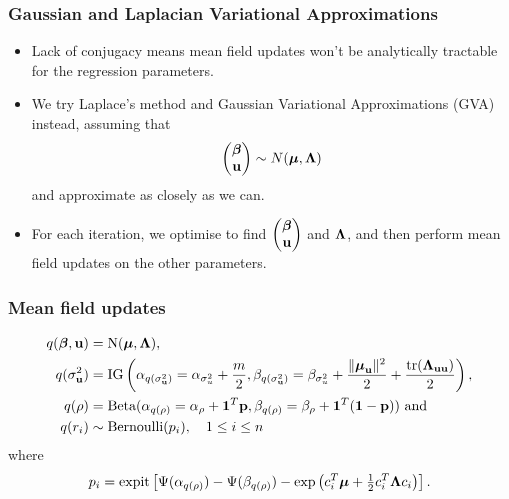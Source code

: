 \documentclass{beamer}
\begin{document}
\begin{frame}
	\frametitle{Gaussian and Laplacian Variational Approximations}
	\begin{itemize}
		\item Lack of conjugacy means mean field updates won't be analytically tractable for the regression parameters.
		\item We try Laplace's method and Gaussian Variational Approximations (GVA) instead, assuming that
		      $$
		      \begin{pmatrix}
		      	{\boldsymbol\beta} \\
		      	{\bf u}    
		      \end{pmatrix}
		      \sim N({\boldsymbol \mu}, {\boldsymbol \Lambda})
		      $$
		      and approximate as closely as we can.
		\item For each iteration, we optimise to find
		      $\begin{pmatrix}
		      	{\boldsymbol\beta} \\
		      	{\bf u}    
		      \end{pmatrix}
		      $ and ${\boldsymbol \Lambda}$,
		      and then perform mean field updates on the other parameters.
	\end{itemize}
\end{frame}

\begin{frame}
	\frametitle{Mean field updates}
	\begin{align*}
		q({\boldsymbol \beta}, {\bf u})    & = \text{N}({\boldsymbol \mu}, {\boldsymbol \Lambda}),                                                                                                                                                                                 \\
		q(\sigma_{{\bf u}}^2) & = \text{IG}\left(\alpha_{q(\sigma_{{\bf u}}^2)} = \alpha_{\sigma_u^2} + \frac{m}{2}, \beta_{q(\sigma_{{\bf u}}^2)} = \beta_{\sigma_u^2} + \frac{\|{\boldsymbol \mu}_{\bf u}\|^2}{2} + \frac{\text{tr}({\boldsymbol \Lambda}_{{\bf u}{\bf u}})}{2}\right), \\
		q(\rho)           & = \text{Beta}(\alpha_{q(\rho)} = \alpha_\rho + {\bf 1}^T{\bf p}, \beta_{q(\rho)} = \beta_\rho + {\bf 1}^T({\bf 1} - {\bf p}))\text{ and}                                                                                  \\
		q(r_i)            & \sim \text{Bernoulli}{(p_i)}, \ \ \ 1 \leq i \leq n                                                                                                                                                         
	\end{align*}
	where
	$$
	p_i = \text{expit} \left [\Psi{(\alpha_{q(\rho)})} - \Psi{(\beta_{q(\rho)})} - \exp{\left(c_i^T{\boldsymbol\mu}+  \tfrac{1}{2} c_i^T {\boldsymbol\Lambda}c_i\right)} \right ].
	$$
\end{frame}
\end{document}
